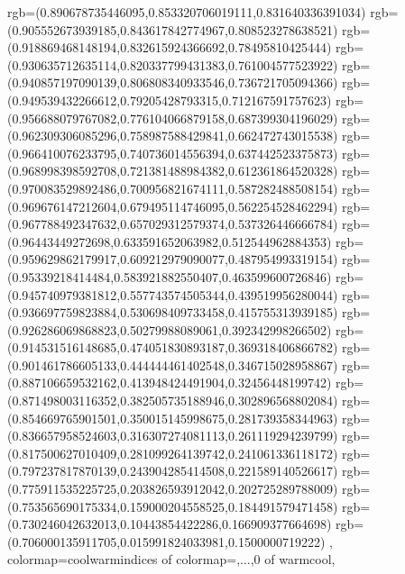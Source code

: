 {{rgb=(0.890678735446095,0.853320706019111,0.831640336391034)
rgb=(0.905552673939185,0.843617842774967,0.808523278638521)
rgb=(0.918869468148194,0.832615924366692,0.78495810425444)
rgb=(0.930635712635114,0.820337799431383,0.761004577523922)
rgb=(0.940857197090139,0.806808340933546,0.736721705094366)
rgb=(0.949539432266612,0.79205428793315,0.712167591757623)
rgb=(0.956688079767082,0.776104066879158,0.687399304196029)
rgb=(0.962309306085296,0.758987588429841,0.662472743015538)
rgb=(0.966410076233795,0.740736014556394,0.637442523375873)
rgb=(0.968998398592708,0.721381488984382,0.612361864520328)
rgb=(0.970083529892486,0.700956821674111,0.587282488508154)
rgb=(0.969676147212604,0.679495114746095,0.562254528462294)
rgb=(0.967788492347632,0.657029312579374,0.537326446666784)
rgb=(0.96443449272698,0.633591652063982,0.512544962884353)
rgb=(0.959629862179917,0.609212979090077,0.487954993319154)
rgb=(0.95339218414484,0.583921882550407,0.463599600726846)
rgb=(0.945740979381812,0.557743574505344,0.439519956280044)
rgb=(0.936697759823884,0.530698409733458,0.415755313939185)
rgb=(0.926286069868823,0.50279988089061,0.392342998266502)
rgb=(0.914531516148685,0.474051830893187,0.369318406866782)
rgb=(0.901461786605133,0.444444461402548,0.346715028958867)
rgb=(0.887106659532162,0.413948424491904,0.32456448199742)
rgb=(0.871498003116352,0.382505735188946,0.302896568802084)
rgb=(0.854669765901501,0.350015145998675,0.281739358344963)
rgb=(0.836657958524603,0.316307274081113,0.261119294239799)
rgb=(0.817500627010409,0.281099264139742,0.241061336118172)
rgb=(0.797237817870139,0.243904285414508,0.221589140526617)
rgb=(0.775911535225725,0.203826593912042,0.202725289788009)
rgb=(0.753565690175334,0.159000204558525,0.184491579471458)
rgb=(0.730246042632013,0.10443854422286,0.166909377664698)
rgb=(0.706000135911705,0.015991824033981,0.1500000719222)
},
colormap={coolwarm}{indices of colormap={,...,0 of warmcool}},
}




